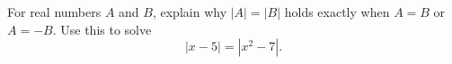 For real numbers $A$ and $B$, explain why $|A|=|B|$ holds exactly when $A=B$ or $A=-B$. Use this to solve
\[
|x-5|=\left|x^2-7\right| .
\]

